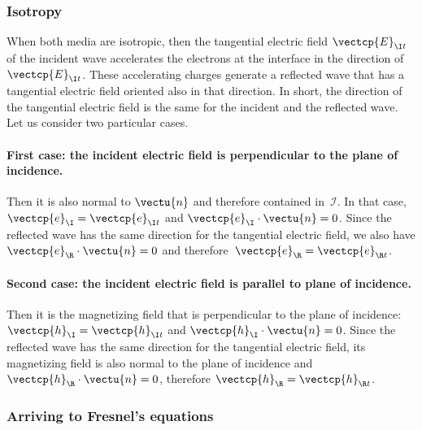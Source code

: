 \begin{refsection}

\subsubsection{Isotropy}
\label{sec:complex_fresnel_isotropy}

When both media are isotropic, then the tangential electric field $\vectcp{E}_{\I t}$ of the incident wave accelerates the electrons at the interface in the direction of $\vectcp{E}_{\I t}$.
These accelerating charges generate a reflected wave that has a tangential electric field oriented also in that direction.
In short, the direction of the tangential electric field is the same for the incident and the reflected wave.
Let us consider two particular cases.

\paragraph{First case: the incident electric field is perpendicular to the plane of incidence.}
Then it is also normal to $\vectu{n}$ and therefore contained in~$\mathcal{I}$.
In that case, $\vectcp{e}_\I = \vectcp{e}_{\I t}$ and $\vectcp{e}_\I\cdot\vectu{n}=0$.
Since the reflected wave has the same direction for the tangential electric field, we also have $\vectcp{e}_\R\cdot\vectu{n}=0$ and therefore~$\vectcp{e}_\R = \vectcp{e}_{\R t}$.

\paragraph{Second case: the incident electric field is parallel to plane of incidence.} Then it is the magnetizing field that is perpendicular to the plane of incidence: $\vectcp{h}_\I = \vectcp{h}_{\I t}$ and $\vectcp{h}_\I\cdot\vectu{n}=0$.
Since the reflected wave has the same direction for the tangential electric field, its magnetizing field is also normal to the plane of incidence and $\vectcp{h}_\R\cdot\vectu{n}=0$, therefore $\vectcp{h}_\R = \vectcp{h}_{\R t}$.




\subsubsection{Arriving to Fresnel's equations}


\end{refsection}
